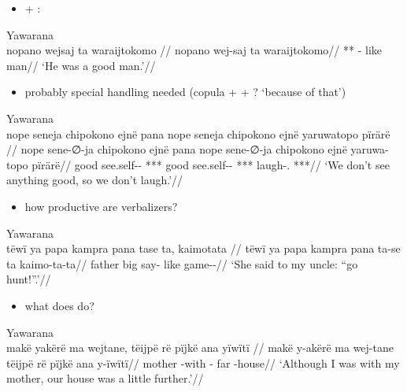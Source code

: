 \documentclass{memoir}
\begin{document}
\begin{itemize}
\tightlist
\item
   + :
\end{itemize}

\ex Yawarana \\
\label{anfoperso-45}    \begingl
    \glpreamble  nopano wejsaj ta waraijtokomo //
    \gla nopano wej-saj ta waraijtokomo//
    \glb *** - like man//
        \glft ‘He was a good man.’//  
    \endgl 
\xe

\begin{itemize}
\tightlist
\item
  probably special handling needed (copula +  + ? `because of
  that')
\end{itemize}

\ex Yawarana \\
\label{convrisamaj-29}    \begingl
    \glpreamble  nope seneja chipokono ejnë pana nope seneja chipokono ejnë yaruwatopo pïrärë //
    \gla nope sene-∅-ja chipokono ejnë pana nope sene-∅-ja chipokono ejnë yaruwa-topo pïrärë//
    \glb good see.self-- ***   good see.self-- ***  laugh-. ***//
        \glft ‘We don’t see anything good, so we don’t laugh.’//  
    \endgl 
\xe

\begin{itemize}
\tightlist
\item
  how productive are verbalizers?
\end{itemize}

\ex Yawarana \\
\label{anfoperso-22}    \begingl
    \glpreamble  tëwï ya papa kampra pana tase ta, kaimotata //
    \gla tëwï ya papa kampra pana ta-se ta kaimo-ta-ta//
    \glb {}  father big  say- like game--//
        \glft ‘She said to my uncle: “go hunt!”.’//  
    \endgl 
\xe

\begin{itemize}
\tightlist
\item
  what does  do?
\end{itemize}

\ex Yawarana \\
\label{anfoperso-52}    \begingl
    \glpreamble  makë yakërë ma wejtane, tëijpë rë pïjkë ana yïwïtï //
    \gla makë y-akërë ma wej-tane tëijpë rë pïjkë ana y-ïwïtï//
    \glb mother -with  - far    -house//
        \glft ‘Although I was with my mother, our house was a little further.’//  
    \endgl 
\xe
\end{document}
